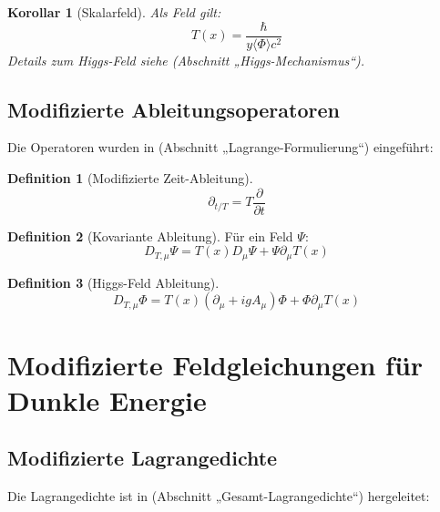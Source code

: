 \documentclass[a4paper,12pt]{article}
\newtheorem{corollary}[theorem]{Korollar}
\theoremstyle{definition}
\newtheorem{definition}{Definition}[theorem]
\theoremstyle{remark}
\newcommand{\Tfield}{T(x)} %
\newcommand{\DhiggsT}{\Tfield (\partial_\mu + ig A_\mu) \Phi + \Phi \partial_\mu \Tfield}
\begin{document}
	\begin{corollary}[Skalarfeld]
		Als Feld gilt:
		\begin{equation}
			\Tfield = \frac{\hbar}{y \langle\Phi\rangle c^2}
		\end{equation}
		Details zum Higgs-Feld siehe \cite{pascher_higgs_2025} (Abschnitt „Higgs-Mechanismus“).
	\end{corollary}
	
	\subsection{Modifizierte Ableitungsoperatoren}
	
	Die Operatoren wurden in \cite{pascher_lagrange_2025} (Abschnitt „Lagrange-Formulierung“) eingeführt:
	
	\begin{definition}[Modifizierte Zeit-Ableitung]
		\begin{equation}
			\partial_{t/T} = T \frac{\partial}{\partial t}
		\end{equation}
	\end{definition}
	
	\begin{definition}[Kovariante Ableitung]
		Für ein Feld \(\Psi\):
		\begin{equation}
			D_{T,\mu} \Psi = \Tfield D_\mu \Psi + \Psi \partial_\mu \Tfield
		\end{equation}
	\end{definition}
	
	\begin{definition}[Higgs-Feld Ableitung]
		\begin{equation}
			D_{T,\mu} \Phi = \DhiggsT
		\end{equation}
	\end{definition}
	
	\section{Modifizierte Feldgleichungen für Dunkle Energie}
	
	\subsection{Modifizierte Lagrangedichte}
	
	Die Lagrangedichte ist in \cite{pascher_lagrange_2025} (Abschnitt „Gesamt-Lagrangedichte“) hergeleitet:
	
\end{document}
